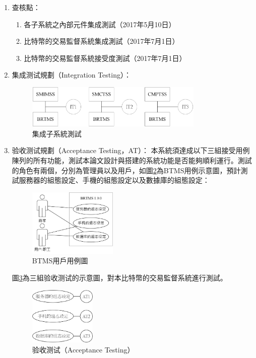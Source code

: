\begin{enumerate}
			\item 查核點：

				\begin{enumerate}
	 				\item 各子系統之內部元件集成測試（2017年5月10日）
	 				\item 比特幣的交易監督系統集成測試（2017年7月1日）
	 				\item 比特幣的交易監督系統接受度測試（2017年7月1日）
	 			\end{enumerate}

	 		\item 集成测试規劃（Integration Testing）：
	 			\begin{figure}[!htbp]
					\centering
					\includegraphics[width = 0.8\textwidth]{IntegrationTesting.png}
					\caption{集成子系統測試}\label{IntegrationTesting}
				\end{figure}
			\item 验收测试規劃（Acceptance Testing，AT）：
				本系統須達成以下三組接受用例陳列的所有功能，測試本論文設計與搭建的系統功能是否能夠順利運行。測試的角色有兩個，分別為管理員以及用戶，如圖\ref{usecasediagram}為BTMS用例示意圖，預計測試服務器的組態設定、手機的組態設定以及數據庫的組態設定：

					\begin{figure}[!htbp]
						\centering
						\includegraphics[width = 0.4\textwidth]{usecasediagram.jpg}
						\caption{BTMS用戶用例圖}\label{usecasediagram}
					\end{figure}

				圖\ref{AcceptanceTesting}為三組验收测试的示意圖，對本比特幣的交易監督系統進行測試。
					\begin{figure}[!htbp]
						\centering
						\includegraphics[width = 0.3\textwidth]{AcceptanceTesting.png}
						\caption{验收测试（Acceptance Testing）}\label{AcceptanceTesting}
					\end{figure}

	 		\end{enumerate}			

